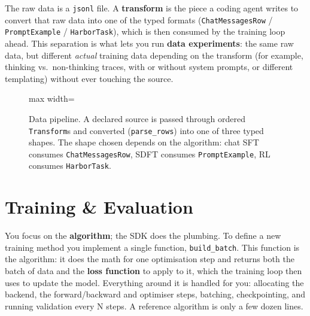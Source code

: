 \documentclass[11pt]{article}
\newcommand{\code}[1]{\texttt{\small #1}}
\begin{document}
The raw data is a \code{jsonl} file. A \textbf{transform} is the piece a coding
agent writes to convert that raw data into one of the typed formats
(\code{ChatMessagesRow} / \code{PromptExample} / \code{HarborTask}), which is
then consumed by the training loop ahead. This separation is what lets you run
\textbf{data experiments}: the same raw data, but different \emph{actual}
training data depending on the transform (for example, thinking
vs.\ non-thinking traces, with or without system prompts, or different
templating) without ever touching the source.

\begin{figure}[H]
\centering
\begin{adjustbox}{max width=\linewidth}
\end{adjustbox}
\caption{Data pipeline. A declared source is passed through ordered
\code{Transform}s and converted (\code{parse\_rows}) into one of three typed
shapes. The shape chosen depends on the algorithm: chat SFT consumes
\code{ChatMessagesRow}, SDFT consumes \code{PromptExample}, RL consumes
\code{HarborTask}.}
\end{figure}



\section{Training \& Evaluation}

You focus on the \textbf{algorithm}; the SDK does the plumbing. To define a new
training method you implement a single function, \code{build\_batch}. This
function is the algorithm: it does the math for one optimisation step and returns
both the batch of data and the \textbf{loss function} to apply to it, which the
training loop then uses to update the model. Everything around it is handled for
you: allocating the backend, the forward/backward and optimiser steps, batching,
checkpointing, and running validation every N steps. A reference algorithm is
only a few dozen lines.
\end{document}
